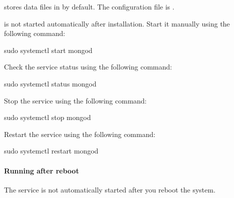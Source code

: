 \documentclass[letterpaper,10pt,english]{sphinxmanual}
\begin{document}
\sphinxAtStartPar
{} stores data files in  by default.
The configuration file is .

\sphinxAtStartPar
{}

\sphinxAtStartPar
{} is not started automatically after installation. Start it manually using the following command:

\begin{sphinxVerbatim}[commandchars=\\\{\}]
\PYGZdl{} sudo systemctl start mongod
\end{sphinxVerbatim}

\sphinxAtStartPar
{}

\sphinxAtStartPar
Check the service status using the following command: 

\begin{sphinxVerbatim}[commandchars=\\\{\}]
\PYGZdl{} sudo systemctl status mongod
\end{sphinxVerbatim}

\sphinxAtStartPar
{}

\sphinxAtStartPar
Stop the service using the following command: 

\begin{sphinxVerbatim}[commandchars=\\\{\}]
\PYGZdl{} sudo systemctl stop mongod
\end{sphinxVerbatim}

\sphinxAtStartPar
{}

\sphinxAtStartPar
Restart the service using the following command: 

\begin{sphinxVerbatim}[commandchars=\\\{\}]
\PYGZdl{} sudo systemctl restart mongod
\end{sphinxVerbatim}


\paragraph{Running after reboot}
\label{\detokenize{install/yum:running-after-reboot}}
\sphinxAtStartPar
The  service is not automatically started
after you reboot the system.
\end{document}
